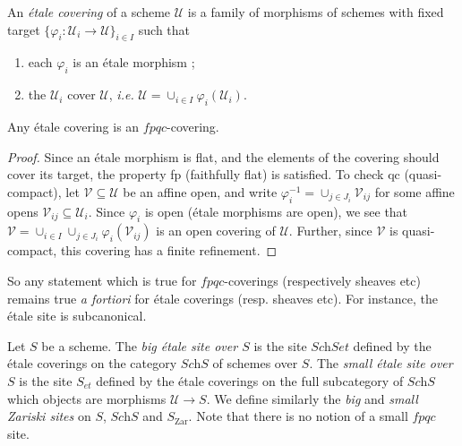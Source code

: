 \begin{definition}
An \emph{\'etale covering} of a scheme $\mathcal{U}$ is a family of morphisms 
of schemes with fixed target $\{ \varphi_i : \mathcal{U}_i \to \mathcal{U} 
\}_{i \in I}$ such that 
\begin{enumerate}
\item each $\varphi_i$ is an \'etale morphism ;
\item the $\mathcal{U}_i$ cover $\mathcal{U}$, {\it i.e.} $\mathcal{U} = 
\cup_{i\in I}\varphi_i(\mathcal{U}_i)$.
\end{enumerate}
\end{definition}

\begin{lemma}
Any \'etale covering is an $fpqc$-covering. 
\end{lemma}

\begin{proof}
Since an \'etale morphism is flat, and the elements of the covering should 
cover its target, the property fp (faithfully flat) is satisfied. To check qc 
(quasi-compact), let $\mathcal{V} \subseteq \mathcal{U}$ be an affine open, and 
write $\varphi_i^{-1} = \cup_{j \in J_i} \mathcal{V}_{ij}$ for some affine 
opens $\mathcal{V}_{ij} \subseteq \mathcal{U}_i$. Since $\varphi_i$ is open 
(\'etale morphisms are open), we see that $\mathcal{V} = \cup_{i\in I}\cup_{j 
\in J_i} \varphi_i(\mathcal{V}_{ij})$ is an open covering of $\mathcal{U}$. 
Further, since $\mathcal{V}$ is quasi-compact, this covering has a finite 
refinement.
\end{proof}

\noindent
So any statement which is true for $fpqc$-coverings (respectively sheaves etc) 
remains true {\it a fortiori} for \'etale coverings (resp. sheaves etc). For 
instance, the \'etale site is subcanonical.

\begin{definition}
Let $S$ be a scheme. The \emph{big \'etale site over $S$} is the site 
$\textit{Sch}Set$ defined by the \'etale coverings on the category 
$\textit{Sch}S$ of schemes over $S$. The \emph{small \'etale site over $S$} is 
the site $S_{et}$ defined by the \'etale coverings on the full subcategory of 
$\textit{Sch}S$ which objects are morphisms $\mathcal{U} \to S$. We define 
similarly the \emph{big} and \emph{small Zariski sites} on $S$, $\textit{Sch}S$ 
and $S_\mathrm{Zar}$. Note that there is no notion of a small $fpqc$ site.
\end{definition}

